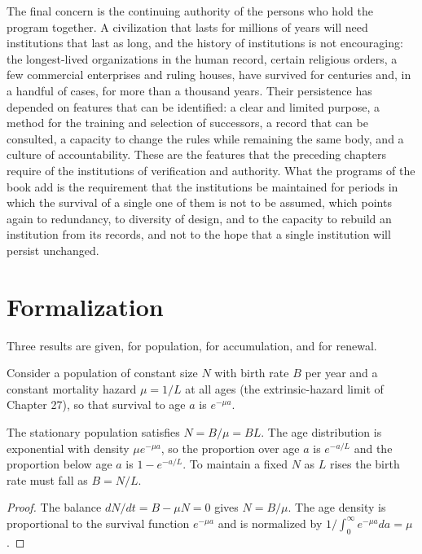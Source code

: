 The final concern is the continuing authority of the persons who hold the program together. A civilization that lasts for millions of years will need institutions that last as long, and the history of institutions is not encouraging: the longest-lived organizations in the human record, certain religious orders, a few commercial enterprises and ruling houses, have survived for centuries and, in a handful of cases, for more than a thousand years. Their persistence has depended on features that can be identified: a clear and limited purpose, a method for the training and selection of successors, a record that can be consulted, a capacity to change the rules while remaining the same body, and a culture of accountability. These are the features that the preceding chapters require of the institutions of verification and authority. What the programs of the book add is the requirement that the institutions be maintained for periods in which the survival of a single one of them is not to be assumed, which points again to redundancy, to diversity of design, and to the capacity to rebuild an institution from its records, and not to the hope that a single institution will persist unchanged.

\section*{Formalization}

Three results are given, for population, for accumulation, and for renewal.

Consider a population of constant size $N$ with birth rate $B$ per year and a constant mortality hazard $\mu=1/L$ at all ages (the extrinsic-hazard limit of Chapter 27), so that survival to age $a$ is $e^{-\mu a}$.

\begin{proposition}
The stationary population satisfies $N=B/\mu=BL$. The age distribution is exponential with density $\mu e^{-\mu a}$, so the proportion over age $a$ is $e^{-a/L}$ and the proportion below age $a$ is $1-e^{-a/L}$. To maintain a fixed $N$ as $L$ rises the birth rate must fall as $B=N/L$.
\end{proposition}

\begin{proof}
The balance $dN/dt=B-\mu N=0$ gives $N=B/\mu$. The age density is proportional to the survival function $e^{-\mu a}$ and is normalized by $1/\int_0^\infty e^{-\mu a}da=\mu$.
\end{proof}

